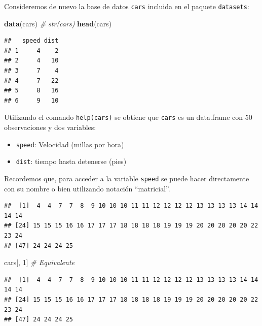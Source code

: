 \documentclass[]{book}
\newenvironment{Shaded}{\begin{snugshade}}{\end{snugshade}}
\newcommand{\CommentTok}[1]{\textcolor[rgb]{0.56,0.35,0.01}{\textit{#1}}}
\newcommand{\DecValTok}[1]{\textcolor[rgb]{0.00,0.00,0.81}{#1}}
\newcommand{\KeywordTok}[1]{\textcolor[rgb]{0.13,0.29,0.53}{\textbf{#1}}}
\newcommand{\NormalTok}[1]{#1}
\newcommand{\OperatorTok}[1]{\textcolor[rgb]{0.81,0.36,0.00}{\textbf{#1}}}
\begin{document}
Consideremos de nuevo la
base de datos \texttt{cars} incluida en el paquete \texttt{datasets}:

\begin{Shaded}
\begin{Highlighting}[]
\KeywordTok{data}\NormalTok{(cars)}
\CommentTok{# str(cars)}
\KeywordTok{head}\NormalTok{(cars)}
\end{Highlighting}
\end{Shaded}

\begin{verbatim}
##   speed dist
## 1     4    2
## 2     4   10
## 3     7    4
## 4     7   22
## 5     8   16
## 6     9   10
\end{verbatim}

Utilizando el comando \texttt{help(cars)}
se obtiene que \texttt{cars} es un data.frame con 50 observaciones y dos
variables:

\begin{itemize}
\item
  \texttt{speed}: Velocidad (millas por hora)
\item
  \texttt{dist}: tiempo hasta detenerse (pies)
\end{itemize}

Recordemos que, para acceder a la variable \texttt{speed} se puede
hacer directamente con su nombre o bien utilizando notación
``matricial''.

\begin{Shaded}
\end{Shaded}

\begin{verbatim}
##  [1]  4  4  7  7  8  9 10 10 10 11 11 12 12 12 12 13 13 13 13 14 14 14 14
## [24] 15 15 15 16 16 17 17 17 18 18 18 18 19 19 19 20 20 20 20 20 22 23 24
## [47] 24 24 24 25
\end{verbatim}

\begin{Shaded}
\begin{Highlighting}[]
\NormalTok{cars[, }\DecValTok{1}\NormalTok{]  }\CommentTok{# Equivalente}
\end{Highlighting}
\end{Shaded}

\begin{verbatim}
##  [1]  4  4  7  7  8  9 10 10 10 11 11 12 12 12 12 13 13 13 13 14 14 14 14
## [24] 15 15 15 16 16 17 17 17 18 18 18 18 19 19 19 20 20 20 20 20 22 23 24
## [47] 24 24 24 25
\end{verbatim}
\end{document}
